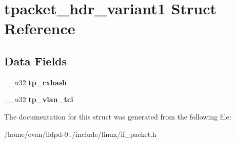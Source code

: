 \section{tpacket\-\_\-hdr\-\_\-variant1 \-Struct \-Reference}
\label{structtpacket__hdr__variant1}
\subsection*{\-Data \-Fields}
\begin{DoxyCompactItemize}
\item 
\-\_\-\-\_\-u32 {\bfseries tp\-\_\-rxhash}\label{structtpacket__hdr__variant1_a24666d42c3c1024c615b28643a613c0b}

\item 
\-\_\-\-\_\-u32 {\bfseries tp\-\_\-vlan\-\_\-tci}\label{structtpacket__hdr__variant1_ac7291023c4e5374d2cbb42c3fc1efd67}

\end{DoxyCompactItemize}


\-The documentation for this struct was generated from the following file\-:\begin{DoxyCompactItemize}
\item 
/home/evan/lldpd-\/0../include/linux/if\-\_\-packet.\-h\end{DoxyCompactItemize}
